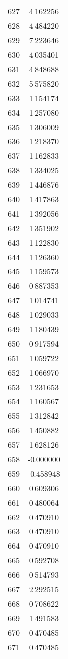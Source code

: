 \documentclass[12pt]{article}
\begin{document}
\begin{longtable}{@{}cc@{}}
627 & 4.162256 \\
628 & 4.484220 \\
629 & 7.223646 \\
630 & 4.035401 \\
631 & 4.848688 \\
632 & 5.575820 \\
633 & 1.154174 \\
634 & 1.257080 \\
635 & 1.306009 \\
636 & 1.218370 \\
637 & 1.162833 \\
638 & 1.334025 \\
639 & 1.446876 \\
640 & 1.417863 \\
641 & 1.392056 \\
642 & 1.351902 \\
643 & 1.122830 \\
644 & 1.126360 \\
645 & 1.159573 \\
646 & 0.887353 \\
647 & 1.014741 \\
648 & 1.029033 \\
649 & 1.180439 \\
650 & 0.917594 \\
651 & 1.059722 \\
652 & 1.066970 \\
653 & 1.231653 \\
654 & 1.160567 \\
655 & 1.312842 \\
656 & 1.450882 \\
657 & 1.628126 \\
658 & -0.000000 \\
659 & -0.458948 \\
660 & 0.609306 \\
661 & 0.480064 \\
662 & 0.470910 \\
663 & 0.470910 \\
664 & 0.470910 \\
665 & 0.592708 \\
666 & 0.514793 \\
667 & 2.292515 \\
668 & 0.708622 \\
669 & 1.491583 \\
670 & 0.470485 \\
671 & 0.470485 \\

\end{longtable}
\end{document}
